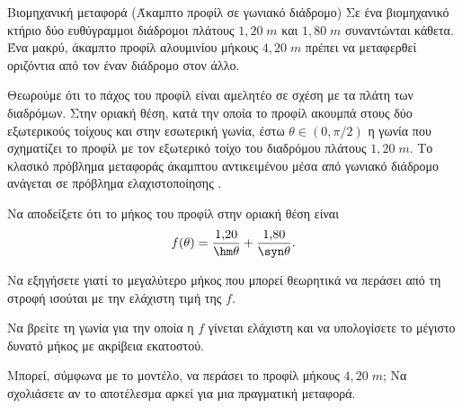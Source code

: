 \begin{problhma}{Βιομηχανική μεταφορά (Άκαμπτο προφίλ σε γωνιακό διάδρομο)}
Σε ένα βιομηχανικό κτήριο δύο ευθύγραμμοι διάδρομοι πλάτους
$1{,}20\;\si{m}$ και $1{,}80\;\si{m}$ συναντώνται κάθετα. Ένα μακρύ,
άκαμπτο προφίλ αλουμινίου μήκους $4{,}20\;\si{m}$ πρέπει να μεταφερθεί
οριζόντια από τον έναν διάδρομο στον άλλο.

Θεωρούμε ότι το πάχος του προφίλ είναι αμελητέο σε σχέση με τα πλάτη
των διαδρόμων. Στην οριακή θέση, κατά την οποία το προφίλ ακουμπά στους
δύο εξωτερικούς τοίχους και στην εσωτερική γωνία, έστω
$\theta\in(0,\pi/2)$ η γωνία που σχηματίζει το προφίλ με τον εξωτερικό
τοίχο του διαδρόμου πλάτους $1{,}20\;\si{m}$. Το κλασικό πρόβλημα
μεταφοράς άκαμπτου αντικειμένου μέσα από γωνιακό διάδρομο ανάγεται σε
πρόβλημα ελαχιστοποίησης
\cite{moser1966movingFurniture}.

\begin{alist}
  \item Να αποδείξετε ότι το μήκος του προφίλ στην οριακή θέση είναι
        \[
          f(\theta)
          =\frac{1{,}20}{\hm\theta}
          +\frac{1{,}80}{\syn\theta}.
        \]
  \item Να εξηγήσετε γιατί το μεγαλύτερο μήκος που μπορεί θεωρητικά να
        περάσει από τη στροφή ισούται με την ελάχιστη τιμή της $f$.
  \item Να βρείτε τη γωνία για την οποία η $f$ γίνεται ελάχιστη και να
        υπολογίσετε το μέγιστο δυνατό μήκος με ακρίβεια εκατοστού.
  \item Μπορεί, σύμφωνα με το μοντέλο, να περάσει το προφίλ μήκους
        $4{,}20\;\si{m}$; Να σχολιάσετε αν το αποτέλεσμα αρκεί για μια
        πραγματική μεταφορά.
\end{alist}
\end{problhma}


